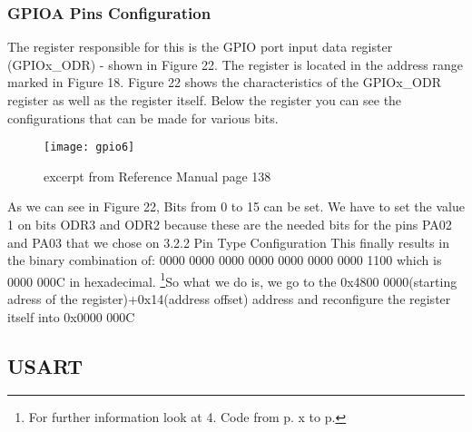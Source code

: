 \documentclass[11pt]{scrartcl}
\begin{document}
	\subsubsection{GPIOA Pins Configuration}
The register responsible for this is the GPIO port input data register (GPIOx\_ODR) - shown in Figure 22. The register is located in the address range marked in Figure 18. Figure 22 shows the characteristics of the GPIOx\_ODR register as well as the register itself. Below the register you can see the configurations that can be made for various bits.
\begin{figure}[h]
		\centering
		\texttt{[image: gpio6]}
		\caption{excerpt from Reference Manual page 138}
\end{figure}
\newline
As we can see in Figure 22, Bits from 0 to 15 can be set. We have to set the value 1 on bits ODR3 and ODR2 because these are the needed bits for the pins PA02 and PA03 that we chose on 3.2.2 Pin Type Configuration \newline\newline
This finally results in the binary combination of: 0000 0000 0000 0000 0000 0000 0000 1100 which is 0000 000C in hexadecimal.
\newline\newline
\footnote{\label{foot:20}For further information look at 4. Code from p. x to p.}So what we do is, we go to the 0x4800 0000(starting adress of the register)+0x14(address offset) address and reconfigure the register itself into 0x0000 000C
	
	
	
\newpage
	\subsection{USART}
\end{document}
